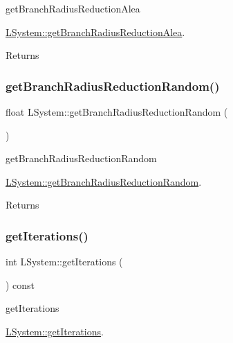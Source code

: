get\+Branch\+Radius\+Reduction\+Alea 

\hyperlink{classLSystem_af237321da5b4bad46d2422cd29b46986}{L\+System\+::get\+Branch\+Radius\+Reduction\+Alea}.

\begin{DoxyReturn}{Returns}

\end{DoxyReturn}
\mbox{\label{classLSystem_a868ccee91400bb3636befe0bdeab79d3}} 
\subsubsection{\texorpdfstring{get\+Branch\+Radius\+Reduction\+Random()}{getBranchRadiusReductionRandom()}}
{\footnotesize\ttfamily float L\+System\+::get\+Branch\+Radius\+Reduction\+Random (\begin{DoxyParamCaption}{ }\end{DoxyParamCaption})}



get\+Branch\+Radius\+Reduction\+Random 

\hyperlink{classLSystem_a868ccee91400bb3636befe0bdeab79d3}{L\+System\+::get\+Branch\+Radius\+Reduction\+Random}.

\begin{DoxyReturn}{Returns}

\end{DoxyReturn}
\mbox{\label{classLSystem_a704c6d2fed8cdc1dd0d298d4172cf54b}} 
\subsubsection{\texorpdfstring{get\+Iterations()}{getIterations()}}
{\footnotesize\ttfamily int L\+System\+::get\+Iterations (\begin{DoxyParamCaption}{ }\end{DoxyParamCaption}) const}



get\+Iterations 

\hyperlink{classLSystem_a704c6d2fed8cdc1dd0d298d4172cf54b}{L\+System\+::get\+Iterations}.

